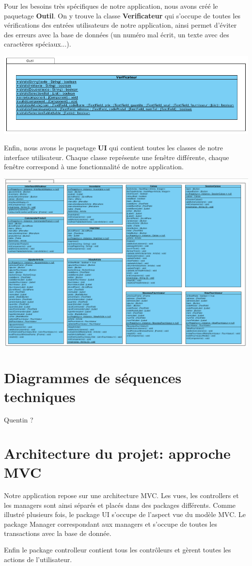 Pour les besoins très spécifiques de notre application, nous avons créé le paquetage \textbf{Outil}. On y trouve la classe \textbf{Verificateur} qui s'occupe de toutes les vérifications des entrées utilisateurs de notre application, ainsi permet d'éviter des erreurs avec la base de données (un numéro mal écrit, un texte avec des caractères spéciaux...).

\begin{center}
\includegraphics[width=14cm]{./Conception/outil}
\end{center}

Enfin, nous avons le paquetage \textbf{UI} qui contient toutes les classes de notre interface utilisateur. Chaque classe représente une fenêtre différente, chaque fenêtre correspond à une fonctionnalité de notre application.

\begin{center}
\includegraphics[width=14cm]{./Conception/ui}
\end{center}


\section{Diagrammes de séquences techniques}

Quentin ?

\section{Architecture du projet: approche MVC}
Notre application repose sur une architecture MVC. Les vues, les controllers et les managers sont ainsi séparés et placés dans des packages différents.
Comme illustré plusieurs fois, le package UI s'occupe de l'aspect vue du modèle MVC.
Le package Manager correspondant aux managers et s'occupe de toutes les transactions avec la base de donnée.

Enfin le package controlleur contient tous les contrôleurs et gèrent toutes les actions de l'utilisateur. 